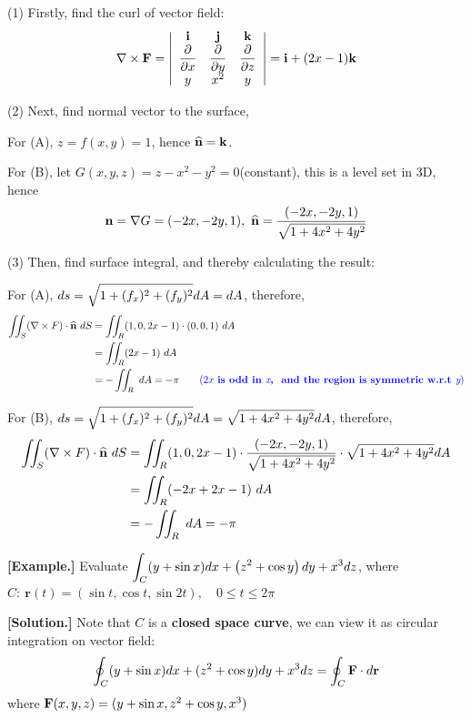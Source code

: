 \documentclass[11pt, a4paper]{MATH2023}
\newcommand{\eg}{\textbf{[Example.] }}
\newcommand{\sol}{\textbf{[Solution.] }}
\newcommand{\ii}{{\bf i}}
\newcommand{\jj}{{\bf j}}
\newcommand{\kk}{{\bf k}}
\newcommand{\rr}{{\bf r}}
\newcommand{\FF}{{\bf F}}
\newcommand{\nm}{\widehat{\bf n}}
\newcommand{\pt}{\partial}
\begin{document}
\begin{spacing}{1.3}
    (1) Firstly, find the curl of vector field:
    $$\nabla\times \FF=\left|\begin{array}{ccc}
        \ii & \jj & \kk \\
        \dfrac{\pt }{\pt x} & \dfrac{\pt}{\pt y} & \dfrac{\pt}{\pt z}\\
        y & x^2 & y
    \end{array} \right|=\ii+(2x-1)\kk$$

    (2) Next, find normal vector to the surface,

    \quad For (A), $z=f(x,y)=1$, hence $\nm = \kk$.

    \quad For (B), let $G(x,y,z)=z-x^2-y^2=0$(constant), this is a level set in 3D, hence 
    $${\bf n} =\nabla G=(-2x, -2y, 1),\ \nm =\frac{(-2x,-2y,1)}{\sqrt{1+4x^2+4y^2}}$$

    (3) Then, find surface integral, and thereby calculating the result:

    \quad For (A), $\displaystyle ds=\sqrt{1+(f_x)^2+(f_y)^2} dA=dA$, therefore,
    \begin{align*}
        \iint_S(\nabla \times F)\cdot \nm \ dS &= \iint_R (1,0,2x-1)\cdot (0,0,1)\ dA\\
        &=\iint_R (2x-1)\  dA\\
        &= -\iint_R \ dA = -\pi \qquad {\blue (2x\ \textbf{is\ odd\ in\ {\it x},
        \ and\ the\ region\ is\ symmetric\ w.r.t\ {\it y}})}
    \end{align*}

    \quad For (B), $\displaystyle ds=\sqrt{1+(f_x)^2+(f_y)^2} dA=\sqrt{1+4x^2+4y^2}dA$, therefore,
    \begin{align*}
        \iint_S(\nabla \times F)\cdot \nm \ dS 
        &= \iint_R (1,0,2x-1)\cdot \frac{(-2x,-2y,1)}{\sqrt{1+4x^2+4y^2}}\cdot \sqrt{1+4x^2+4y^2}dA\\
        &=\iint_R (-2x+2x-1)\  dA\\
        &= -\iint_R \ dA = -\pi
    \end{align*}


    \newpage
    \eg Evaluate $\displaystyle \int_{C}(y+\sin x) d x+\left(z^{2}+\cos y\right) d y+x^{3} d z$, 
    where $C:\ \mathbf{r}(t)=(\sin t, \cos t, \sin 2 t), \quad 0 \leqslant t \leqslant 2 \pi$
    
    \sol Note that $C$ is a {\bf closed space curve}, we can view it as circular integration on vector field:
    $$\oint_C (y+\sin x)dx+(z^2+\cos y)dy+x^3 dz=\oint_C \FF\cdot d\rr$$
    where $\FF(x,y,z)=(y+\sin x, z^2+\cos y, x^3)$


\end{spacing}
\end{document}
